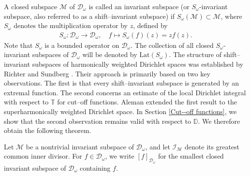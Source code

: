 \documentclass[12pt,reqno,a4paper]{amsart}
\newcommand{\Lat}{\mathrm{Lat}}
\newcommand{\cM}{{\mathcal{M}}}
\newcommand\TT{\mathbb{T}}
\newcommand\DD{\mathbb{D}}
\newcommand{\cD}{{\mathcal{D}}}
\numberwithin{equation}{section}
\begin{document}
A closed subspace $\cM$ of $\cD_\omega$ is called an invariant subspace
(or $S_\omega$-invariant subspace, also referred to as a shift--invariant subspace) if $S_\omega(\cM) \subset \cM$, where $S_\omega$ denotes the multiplication operator by $z$, defined by
\begin{align*}\label{shift}
	S_\omega \colon \cD_\omega \longrightarrow \cD_\omega, \quad f \mapsto S_\omega(f)(z) = z f(z).
\end{align*} 
%
Note that $S_\omega$ is a bounded operator on $\mathcal{D}_\omega$. The collection of all closed $S_\omega$-invariant subspaces of $\mathcal{D}_\omega$ will be denoted by $\mathrm{Lat}(S_\omega)$. The structure of shift--invariant subspaces of harmonically weighted Dirichlet spaces was established by Richter and Sundberg \cite{RS2}.
%
Their approach is primarily based on two key observations. The first is that every shift--invariant subspace is generated by an extremal function. %
The second concerns an estimate of the local Dirichlet integral with respect to $\TT$ for cut--off functions. Aleman \cite{Al} extended the first result to the superharmonically weighted Dirichlet space. In Section \ref{Cut--off functions}, we show that the second observation remains valid with respect to $\DD$. We therefore obtain the following theorem.

Let $\cM$ be a nontrivial invariant subspace of $\cD_\omega$, and let $\mathcal{I}_{\cM}$ denote its greatest common inner divisor. For $f \in \cD_\omega$, we write $[f]_{\cD_\omega}$ for the smallest closed invariant subspace of $\cD_\omega$ containing $f$.
\end{document}
